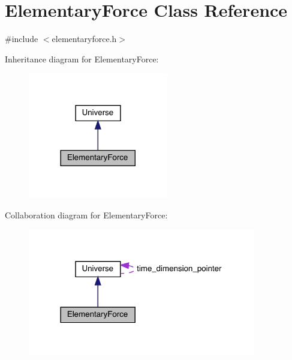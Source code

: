 \hypertarget{class_elementary_force}{}\section{Elementary\+Force Class Reference}
\label{class_elementary_force}


{\ttfamily \#include $<$elementaryforce.\+h$>$}



Inheritance diagram for Elementary\+Force\+:\nopagebreak
\begin{figure}[H]
\begin{center}
\leavevmode
\includegraphics[width=173pt]{class_elementary_force__inherit__graph}
\end{center}
\end{figure}


Collaboration diagram for Elementary\+Force\+:\nopagebreak
\begin{figure}[H]
\begin{center}
\leavevmode
\includegraphics[width=282pt]{class_elementary_force__coll__graph}
\end{center}
\end{figure}
